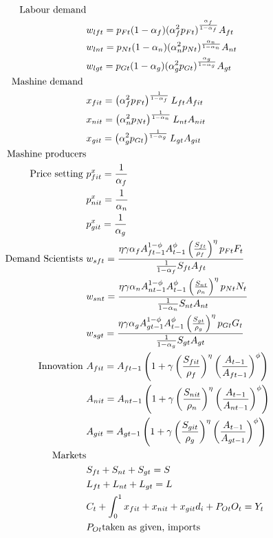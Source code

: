 \begin{align*}
\text{Labour demand}\\
& w_{lft}=p_{Ft}(1-\alpha_f)(\alpha_f^2p_{Ft})^\frac{\alpha_f}{1-\alpha_f}A_{ft}\\
& w_{lnt}=p_{Nt}(1-\alpha_n)(\alpha_n^2p_{Nt})^\frac{\alpha_n}{1-\alpha_n}A_{nt}\\
& w_{lgt}=p_{Gt}(1-\alpha_g)(\alpha_g^2p_{Gt})^\frac{\alpha_g}{1-\alpha_g}A_{gt}\\
\text{Mashine demand}\ \vspace{4mm}\\
&x_{fit}= \left(\alpha_f^2 p_{Ft}\right)^\frac{1}{1-\alpha_f}L_{ft}A_{fit}\\
&x_{nit}= \left(\alpha_n^2 p_{Nt}\right)^\frac{1}{1-\alpha_n}L_{nt}A_{nit}\\
&x_{git}= \left(\alpha_g^2 p_{Gt}\right)^\frac{1}{1-\alpha_g}L_{gt}A_{git}\\
\text{Mashine producers}\\
\text{Price setting}\ \vspace{4mm}&p_{fit}^x=\frac{1}{\alpha_f}\\
&p_{nit}^x=\frac{1}{\alpha_n}\\
&p_{git}^x=\frac{1}{\alpha_g}\\ 
\text{Demand Scientists}\ \vspace{4mm}&
w_{sft}=\frac{\eta \gamma \alpha_f A_{ft-1}^{1-\phi}A_{t-1}^{\phi}\left(\frac{S_{ft}}{\rho_f}\right)^{\eta}p_{Ft}F_t}{\frac{1}{1-\alpha_f}S_{ft}A_{ft}}\\
&
w_{snt}=\frac{\eta \gamma \alpha_n A_{nt-1}^{1-\phi}A_{t-1}^{\phi}\left(\frac{S_{nt}}{\rho_n}\right)^{\eta}p_{Nt}N_t}{\frac{1}{1-\alpha_n}S_{nt}A_{nt}}\\
&
w_{sgt}=\frac{\eta \gamma \alpha_g A_{gt-1}^{1-\phi}A_{t-1}^{\phi}\left(\frac{S_{gt}}{\rho_g}\right)^{\eta}p_{Gt}G_t}{\frac{1}{1-\alpha_g}S_{gt}A_{gt}}\\
\text{Innovation}\ \vspace{4mm}&
A_{fit}=A_{ft-1}\left(1+\gamma\left(\frac{S_{fit}}{\rho_f}\right)^{\eta}\left(\frac{A_{t-1}}{A_{ft-1}}\right)^{\phi}\right) \\
&
A_{nit}=A_{nt-1}\left(1+\gamma\left(\frac{S_{nit}}{\rho_n}\right)^{\eta}\left(\frac{A_{t-1}}{A_{nt-1}}\right)^{\phi}\right) \\
&
A_{git}=A_{gt-1}\left(1+\gamma\left(\frac{S_{git}}{\rho_g}\right)^{\eta}\left(\frac{A_{t-1}}{A_{gt-1}}\right)^{\phi}\right) \\
\text{Markets}&\\
&S_{ft}+S_{nt}+S_{gt}=S\\
&L_{ft}+L_{nt}+L_{gt}=L\\
&C_{t}+\int_{0}^{1} x_{fit}+x_{nit}+x_{git}d_i+P_{Ot}O_t=Y_t\\
&P_{Ot} \text{taken as given, imports}
\end{align*}


